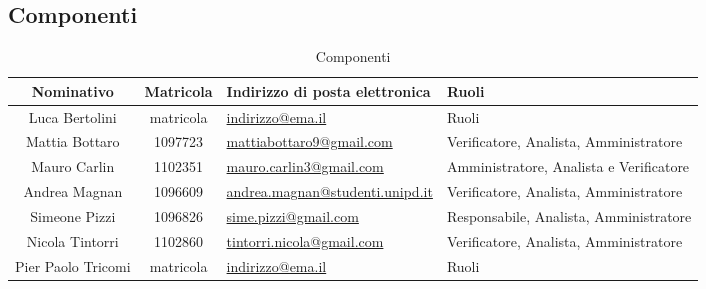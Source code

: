 \documentclass[a4paper,titlepage]{article}
\begin{document}
\subsection{Componenti}
\begin{table}[H]
	\begin{center}
		\setlength{\extrarowheight}{\jot}
		\begin{tabular}{|c|c|p{5cm}|p{4.3cm}|}
			\hline
			\textbf{Nominativo} & \textbf{Matricola} & \raggedright \textbf{Indirizzo di posta elettronica} & \textbf{Ruoli} \\[1ex]
			\hline
	 		Luca Bertolini & matricola	& \href{mailto:indirizzo@ema.il}{indirizzo@ema.il} & Ruoli \\[1ex]
			\hline
			Mattia Bottaro & 1097723	& \href{mailto:mattiabottaro9@gmail.com}{mattiabottaro9@gmail.com} & Verificatore, Analista, Amministratore  \\[1ex]
			\hline
			Mauro Carlin & 1102351	& \href{mailto:indirizzo@ema.il}{mauro.carlin3@gmail.com} & Amministratore, Analista e Verificatore	\\[1ex]
			\hline
			Andrea Magnan & 1096609 & \href{mailto:andrea.magnan@studenti.unipd.it}{andrea.magnan@studenti.unipd.it} & Verificatore, Analista, Amministratore	\\[1ex]
			\hline
			Simeone Pizzi & 1096826	& \href{mailto:sime.pizzi@gmail.com}{sime.pizzi@gmail.com} 	& Responsabile, Analista, Amministratore 	\\[1ex]
			\hline
			Nicola Tintorri	& 1102860 & \href{mailto:tintorri.nicola@gmail.com}{tintorri.nicola@gmail.com} & Verificatore, Analista, Amministratore 	\\[1ex]
			\hline
			Pier Paolo Tricomi	& matricola	& \href{mailto:indirizzo@ema.il}{indirizzo@ema.il} & Ruoli \\[1ex]
			\hline	
		\end{tabular}
	\end{center}
	\caption{Componenti}
\end{table}
\end{document}
